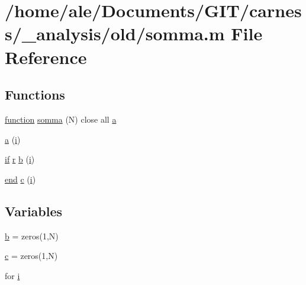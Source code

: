 \hypertarget{a00029}{\section{/home/ale/\-Documents/\-G\-I\-T/carness/\-\_\-analysis/old/somma.m File Reference}
\label{a00029}
}
\subsection*{Functions}
\begin{DoxyCompactItemize}
\item 
\hyperlink{a00062_a4b4c670b101bf7a838f775e008fa6255}{function} \hyperlink{a00029_a7b66d11a6b61842b24e751f211ba7232}{somma} (N) close all \hyperlink{a00029_a2ffdbad9ea59541e59cbd2b938e0770c}{a}
\item 
\hyperlink{a00029_a2ffdbad9ea59541e59cbd2b938e0770c}{a} (\hyperlink{a00065_ad3efca1ea6e3333daf30719ee0501862}{i})
\item 
\hyperlink{a00024_a01d55766b8058903dd360b4bda71f9f5}{if} \hyperlink{a00025_ac862e7284527eb913b1351c8bfb8e079}{r} \hyperlink{a00029_a50b4f3ddde10830a3976c71083aaee3f}{b} (\hyperlink{a00065_ad3efca1ea6e3333daf30719ee0501862}{i})
\item 
\hyperlink{a00019_afb358f48b1646c750fb9da6c6585be2b}{end} \hyperlink{a00029_a6be92348ba85ef257b11d06209e1d7b6}{c} (\hyperlink{a00065_ad3efca1ea6e3333daf30719ee0501862}{i})
\end{DoxyCompactItemize}
\subsection*{Variables}
\begin{DoxyCompactItemize}
\item 
\hyperlink{a00029_a21ad0bd836b90d08f4cf640b4c298e7c}{b} = zeros(1,N)
\item 
\hyperlink{a00029_ae0323a9039add2978bf5b49550572c7c}{c} = zeros(1,N)
\item 
for \hyperlink{a00029_a6f6ccfcf58b31cb6412107d9d5281426}{i}
\end{DoxyCompactItemize}


